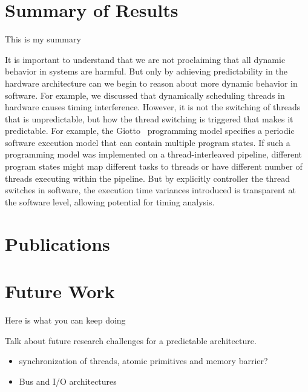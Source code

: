 \section{Summary of Results}

This is my summary

It is important to understand that we are not proclaiming that all dynamic behavior in systems are harmful. 
But only by achieving predictability in the hardware architecture can we begin to reason about more dynamic behavior in software.
For example, we discussed that dynamically scheduling threads in hardware causes timing interference. 
However, it is not the switching of threads that is unpredictable, but how the thread switching is triggered that makes it predictable.   
For example, the Giotto~\cite{henzinger_giotto} programming model specifies a periodic software execution model that can contain multiple program states. 
If such a programming model was implemented on a thread-interleaved pipeline, different program states might map different tasks to threads or have different number of threads executing within the pipeline.
But by explicitly controller the thread switches in software, the execution time variances introduced is transparent at the software level, allowing potential for timing analysis.

\section{Publications}

\section{Future Work}

Here is what you can keep doing

Talk about future research challenges for a predictable architecture.
\begin{itemize}
  \item synchronization of threads, atomic primitives and memory barrier?
  \item Bus and I/O architectures
\end{itemize}
